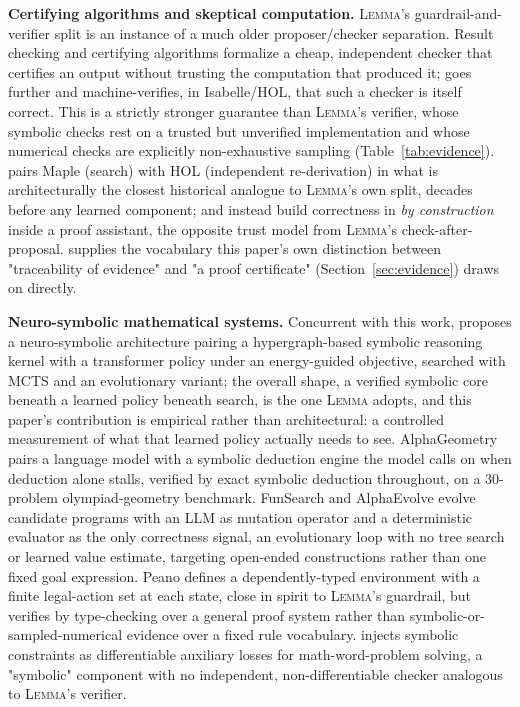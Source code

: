 \documentclass[11pt]{article}
\numberwithin{equation}{section}
\newcommand{\lemma}{\textsc{Lemma}}
\begin{document}
\textbf{Certifying algorithms and skeptical computation.} \lemma{}'s guardrail-and-verifier split is an instance of a much older proposer/checker separation. Result checking \citep{blum1995designing} and certifying algorithms \citep{mcconnell2011certifying} formalize a cheap, independent checker that certifies an output without trusting the computation that produced it; \citet{alkassar2014framework} goes further and machine-verifies, in Isabelle/HOL, that such a checker is itself correct. This is a strictly stronger guarantee than \lemma{}'s verifier, whose symbolic checks rest on a trusted but unverified implementation and whose numerical checks are explicitly non-exhaustive sampling (Table~\ref{tab:evidence}). \citet{harrison1998skeptic} pairs Maple (search) with HOL (independent re-derivation) in what is architecturally the closest historical analogue to \lemma{}'s own split, decades before any learned component; \citet{kaliszyk2007certified} and \citet{thery2001buchberger} instead build correctness in \emph{by construction} inside a proof assistant, the opposite trust model from \lemma{}'s check-after-proposal. \citet{harrison2008formal} supplies the vocabulary this paper's own distinction between "traceability of evidence" and "a proof certificate" (Section~\ref{sec:evidence}) draws on directly.

\textbf{Neuro-symbolic mathematical systems.} Concurrent with this work, \citet{xie2026mathesis} proposes a neuro-symbolic architecture pairing a hypergraph-based symbolic reasoning kernel with a transformer policy under an energy-guided objective, searched with MCTS and an evolutionary variant; the overall shape, a verified symbolic core beneath a learned policy beneath search, is the one \lemma{} adopts, and this paper's contribution is empirical rather than architectural: a controlled measurement of what that learned policy actually needs to see. AlphaGeometry \citep{trinh2024alphageometry} pairs a language model with a symbolic deduction engine the model calls on when deduction alone stalls, verified by exact symbolic deduction throughout, on a 30-problem olympiad-geometry benchmark. FunSearch and AlphaEvolve \citep{romeraparedes2024funsearch,novikov2025alphaevolve} evolve candidate programs with an LLM as mutation operator and a deterministic evaluator as the only correctness signal, an evolutionary loop with no tree search or learned value estimate, targeting open-ended constructions rather than one fixed goal expression. Peano \citep{poesia2023peano} defines a dependently-typed environment with a finite legal-action set at each state, close in spirit to \lemma{}'s guardrail, but verifies by type-checking over a general proof system rather than symbolic-or-sampled-numerical evidence over a fixed rule vocabulary. \citet{qin2021nssolver} injects symbolic constraints as differentiable auxiliary losses for math-word-problem solving, a "symbolic" component with no independent, non-differentiable checker analogous to \lemma{}'s verifier.
\end{document}
